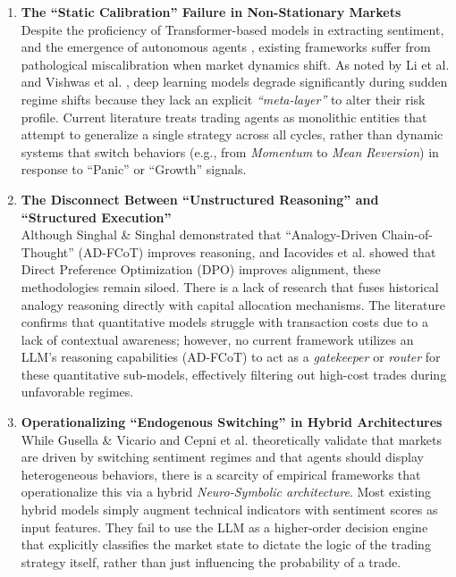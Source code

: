 \documentclass[12pt, a4paper]{report}
\begin{document}
\begin{enumerate}
    \item \textbf{The ``Static Calibration'' Failure in Non-Stationary Markets} \\
    Despite the proficiency of Transformer-based models \cite{huang2023, kirtac2024} in extracting sentiment, and the emergence of autonomous agents \cite{fatouros2025}, existing frameworks suffer from pathological miscalibration when market dynamics shift. As noted by Li et al. \cite{li2025} and Vishwas et al. \cite{vishwas2025}, deep learning models degrade significantly during sudden regime shifts because they lack an explicit \textit{``meta-layer''} to alter their risk profile. Current literature treats trading agents as monolithic entities that attempt to generalize a single strategy across all cycles, rather than dynamic systems that switch behaviors (e.g., from \textit{Momentum} to \textit{Mean Reversion}) in response to ``Panic'' or ``Growth'' signals.

    \item \textbf{The Disconnect Between ``Unstructured Reasoning'' and ``Structured Execution''} \\
    Although Singhal \& Singhal \cite{singhal2025} demonstrated that ``Analogy-Driven Chain-of-Thought'' (AD-FCoT) improves reasoning, and Iacovides et al. \cite{iacovides2025} showed that Direct Preference Optimization (DPO) improves alignment, these methodologies remain siloed. There is a lack of research that fuses historical analogy reasoning directly with capital allocation mechanisms. The literature \cite{drobetz2021} confirms that quantitative models struggle with transaction costs due to a lack of contextual awareness; however, no current framework utilizes an LLM's reasoning capabilities (AD-FCoT) to act as a \textit{gatekeeper} or \textit{router} for these quantitative sub-models, effectively filtering out high-cost trades during unfavorable regimes.

    \item \textbf{Operationalizing ``Endogenous Switching'' in Hybrid Architectures} \\
    While Gusella \& Vicario \cite{gusella2025} and Cepni et al. \cite{cepni2023} theoretically validate that markets are driven by switching sentiment regimes and that agents should display heterogeneous behaviors, there is a scarcity of empirical frameworks that operationalize this via a hybrid \textit{Neuro-Symbolic architecture}. Most existing hybrid models \cite{bobade2025, ballinari2025} simply augment technical indicators with sentiment scores as input features. They fail to use the LLM as a higher-order decision engine that explicitly classifies the market state to dictate the logic of the trading strategy itself, rather than just influencing the probability of a trade.


\end{enumerate}
\end{document}
